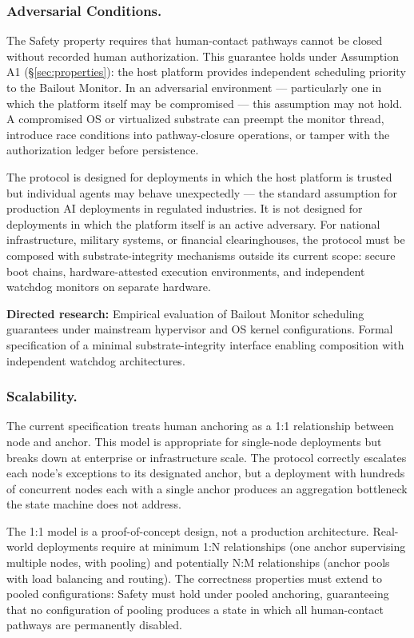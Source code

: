 \subsubsection{Adversarial Conditions.}
The Safety property requires that human-contact pathways cannot be closed without recorded human authorization. This guarantee holds under Assumption A1 (\S\ref{sec:properties}): the host platform provides independent scheduling priority to the Bailout Monitor. In an adversarial environment — particularly one in which the platform itself may be compromised — this assumption may not hold. A compromised OS or virtualized substrate can preempt the monitor thread, introduce race conditions into pathway-closure operations, or tamper with the authorization ledger before persistence.

The protocol is designed for deployments in which the host platform is trusted but individual agents may behave unexpectedly — the standard assumption for production AI deployments in regulated industries. It is not designed for deployments in which the platform itself is an active adversary. For national infrastructure, military systems, or financial clearinghouses, the protocol must be composed with substrate-integrity mechanisms outside its current scope: secure boot chains, hardware-attested execution environments, and independent watchdog monitors on separate hardware.

\textbf{Directed research:} Empirical evaluation of Bailout Monitor scheduling guarantees under mainstream hypervisor and OS kernel configurations. Formal specification of a minimal substrate-integrity interface enabling composition with independent watchdog architectures.

\subsubsection{Scalability.}
The current specification treats human anchoring as a 1:1 relationship between node and anchor. This model is appropriate for single-node deployments but breaks down at enterprise or infrastructure scale. The protocol correctly escalates each node's exceptions to its designated anchor, but a deployment with hundreds of concurrent nodes each with a single anchor produces an aggregation bottleneck the state machine does not address.

The 1:1 model is a proof-of-concept design, not a production architecture. Real-world deployments require at minimum 1:N relationships (one anchor supervising multiple nodes, with pooling) and potentially N:M relationships (anchor pools with load balancing and routing). The correctness properties must extend to pooled configurations: Safety must hold under pooled anchoring, guaranteeing that no configuration of pooling produces a state in which all human-contact pathways are permanently disabled.

